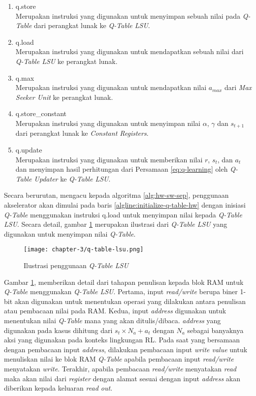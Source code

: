 \begin{enumerate}
	\item q.store\\
	      Merupakan instruksi yang digunakan untuk menyimpan sebuah nilai pada \textit{Q-Table} dari perangkat lunak ke \textit{Q-Table \ac{LSU}}.
	\item q.load\\
	      Merupakan instruksi yang digunakan untuk mendapatkan sebuah nilai dari \textit{Q-Table \ac{LSU}} ke perangkat lunak.
	\item q.max\\
	      Merupakan instruksi yang digunakan untuk mendapatkan nilai $a_{max}$ dari \textit{Max Seeker Unit} ke perangkat lunak.
	\item q.store\_constant\\
	      Merupakan instruksi yang digunakan untuk menyimpan nilai $\alpha$, $\gamma$ dan $s_{t+1}$ dari perangkat lunak ke \textit{Constant Registers}.
	\item q.update\\
	      Merupakan instruksi yang digunakan untuk memberikan nilai $r$, $s_t$, dan $a_t$ dan menyimpan hasil perhitungan dari Persamaan \ref{eq:q-learning} oleh \textit{Q-Table Updater} ke \textit{Q-Table \ac{LSU}}.
\end{enumerate}

Secara berurutan, mengacu kepada algoritma \ref{alg:hw-sw-sep}, penggunaan akselerator akan dimulai pada baris \ref{algline:initialize-q-table-hw} dengan inisiasi \textit{Q-Table} menggunakan instruksi q.load untuk menyimpan nilai kepada \textit{Q-Table \ac{LSU}}. Secara detail, gambar \ref{fig:q-table-lsu} merupakan ilustrasi dari \textit{Q-Table \ac{LSU}} yang digunakan untuk menyimpan nilai \textit{Q-Table}.

\begin{figure}[H]
	\centering
	\texttt{[image: chapter-3/q-table-lsu.png]}
	\caption{Ilustrasi penggunaan \textit{Q-Table LSU}}
	\label{fig:q-table-lsu}
\end{figure}

Gambar \ref{fig:q-table-lsu}, memberikan detail dari tahapan penulisan kepada blok \ac{RAM} untuk \textit{Q-Table} menggunakan \textit{Q-Table \ac{LSU}}. Pertama, input \textit{read/write} berupa biner 1-bit akan digunakan untuk menentukan operasi yang dilakukan antara penulisan atau pembacaan nilai pada \ac{RAM}. Kedua, input \textit{address} digunakan untuk menentukan nilai \textit{Q-Table} mana yang akan ditulis/dibaca. \textit{address} yang digunakan pada kasus dihitung dari $s_t \times N_a + a_t$ dengan $N_a$ sebagai banyaknya aksi yang digunakan pada konteks lingkungan \ac{RL}. Pada saat yang bersamaan dengan pembacaan input \textit{address}, dilakukan pembacaan input \textit{write value} untuk menuliskan nilai ke blok \ac{RAM} \textit{Q-Table} apabila pembacaan input \textit{read/write} menyatakan \textit{write}. Terakhir, apabila pembacaan \textit{read/write} menyatakan \textit{read} maka akan nilai dari \textit{register} dengan alamat sesuai dengan input \textit{address} akan diberikan kepada keluaran \textit{read out}.


